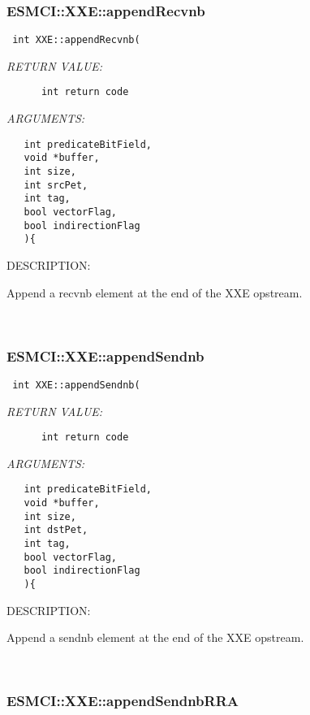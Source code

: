 \subsubsection [ESMCI::XXE::appendRecvnb] {ESMCI::XXE::appendRecvnb}


  
\begin{verbatim} int XXE::appendRecvnb(\end{verbatim}{\em RETURN VALUE:}
\begin{verbatim}      int return code\end{verbatim}{\em ARGUMENTS:}
\begin{verbatim}   int predicateBitField,
   void *buffer,
   int size,
   int srcPet,
   int tag,
   bool vectorFlag,
   bool indirectionFlag
   ){\end{verbatim}
{\sf DESCRIPTION:\\ }


    Append a recvnb element at the end of the XXE opstream. 
 
\mbox{}\hrulefill\
 
\subsubsection [ESMCI::XXE::appendSendnb] {ESMCI::XXE::appendSendnb}


  
\begin{verbatim} int XXE::appendSendnb(\end{verbatim}{\em RETURN VALUE:}
\begin{verbatim}      int return code\end{verbatim}{\em ARGUMENTS:}
\begin{verbatim}   int predicateBitField,
   void *buffer,
   int size,
   int dstPet,
   int tag,
   bool vectorFlag,
   bool indirectionFlag
   ){\end{verbatim}
{\sf DESCRIPTION:\\ }


    Append a sendnb element at the end of the XXE opstream. 
 
\mbox{}\hrulefill\
 
\subsubsection [ESMCI::XXE::appendSendnbRRA] {ESMCI::XXE::appendSendnbRRA}


